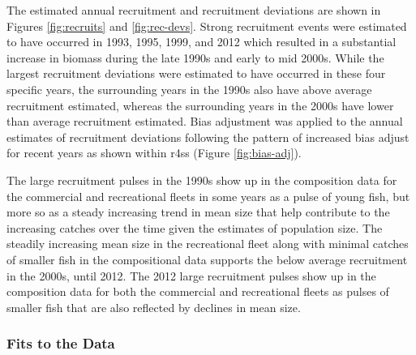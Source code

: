 \documentclass[11pt,
  english,
  a4paper,
]{article}
\begin{document}
\leavevmode\tagmcend\tagstructend\par


The estimated annual recruitment and recruitment deviations are shown in Figures \ref{fig:recruits} and \ref{fig:rec-devs}. Strong recruitment events were estimated to have occurred in 1993, 1995, 1999, and 2012 which resulted in a substantial increase in biomass during the late 1990s and early to mid 2000s. While the largest recruitment deviations were estimated to have occurred in these four specific years, the surrounding years in the 1990s also have above average recruitment estimated, whereas the surrounding years in the 2000s have lower than average recruitment estimated. Bias adjustment was applied to the annual estimates of recruitment deviations following the pattern of increased bias adjust for recent years as shown within r4ss (Figure \ref{fig:bias-adj}).

\leavevmode\tagmcend\tagstructend\par


The large recruitment pulses in the 1990s show up in the composition data for the commercial and recreational fleets in some years as a pulse of young fish, but more so as a steady increasing trend in mean size that help contribute to the increasing catches over the time given the estimates of population size. The steadily increasing mean size in the recreational fleet along with minimal catches of smaller fish in the compositional data supports the below average recruitment in the 2000s, until 2012. The 2012 large recruitment pulses show up in the composition data for both the commercial and recreational fleets as pulses of smaller fish that are also reflected by declines in mean size.

\leavevmode\tagmcend\tagstructend\par


\hypertarget{fits-to-the-data}{%
\subsubsection{Fits to the Data}\label{fits-to-the-data}}

\leavevmode\tagmcend\tagstructend

\end{document}
